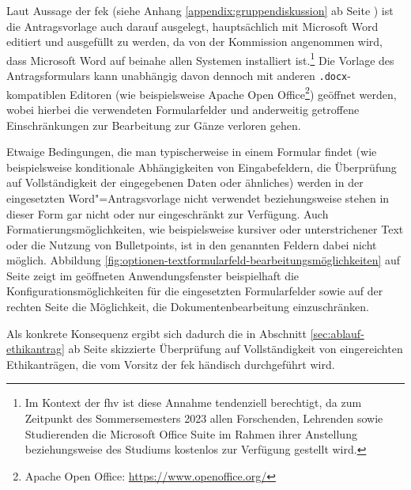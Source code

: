 \documentclass[a4paper,12pt,twoside,numbers=noendperiod]{scrreprt}
\begin{document}
Laut Aussage der \acl{fek} (siehe Anhang \ref{appendix:gruppendiskussion} ab Seite \pageref{appendix:gruppendiskussion}) ist die Antragsvorlage auch darauf ausgelegt, hauptsächlich mit Microsoft Word editiert und ausgefüllt zu werden, da von der Kommission angenommen wird, dass Microsoft Word auf beinahe allen Systemen installiert ist.\footnote{Im Kontext der \acl{fhv} ist diese Annahme tendenziell berechtigt, da zum Zeitpunkt des Sommersemesters 2023 allen Forschenden, Lehrenden sowie Studierenden die Microsoft Office Suite im Rahmen ihrer Anstellung beziehungsweise des Studiums kostenlos zur Verfügung gestellt wird.} Die Vorlage des Antragsformulars kann unabhängig davon dennoch mit anderen \texttt{.docx}-kompatiblen Editoren (wie beispielsweise Apache Open Office\footnote{Apache Open Office: \url{https://www.openoffice.org/}}) geöffnet werden, wobei hierbei die verwendeten Formularfelder und anderweitig getroffene Einschränkungen zur Bearbeitung zur Gänze verloren gehen.

Etwaige Bedingungen, die man typischerweise in einem Formular findet (wie beispielsweise konditionale Abhängigkeiten von Eingabefeldern, die Überprüfung auf Vollständigkeit der eingegebenen Daten oder ähnliches) werden in der eingesetzten Word"=Antragsvorlage nicht verwendet beziehungsweise stehen in dieser Form gar nicht oder nur eingeschränkt zur Verfügung. Auch Formatierungsmöglichkeiten, wie beispielsweise kursiver oder unterstrichener Text oder die Nutzung von Bulletpoints, ist in den genannten Feldern dabei nicht möglich.
Abbildung \ref{fig:optionen-textformularfeld-bearbeitungsmöglichkeiten} auf Seite \pageref{fig:optionen-textformularfeld-bearbeitungsmöglichkeiten} zeigt im geöffneten Anwendungsfenster beispielhaft die Konfigurationsmöglichkeiten für die eingesetzten Formularfelder sowie auf der rechten Seite die Möglichkeit, die Dokumentenbearbeitung einzuschränken.

Als konkrete Konsequenz ergibt sich dadurch die in Abschnitt \ref{sec:ablauf-ethikantrag} ab Seite \pageref{sec:ablauf-ethikantrag} skizzierte Überprüfung auf Vollständigkeit von eingereichten Ethikanträgen, die vom Vorsitz der \ac{fek} händisch durchgeführt wird.
\end{document}
